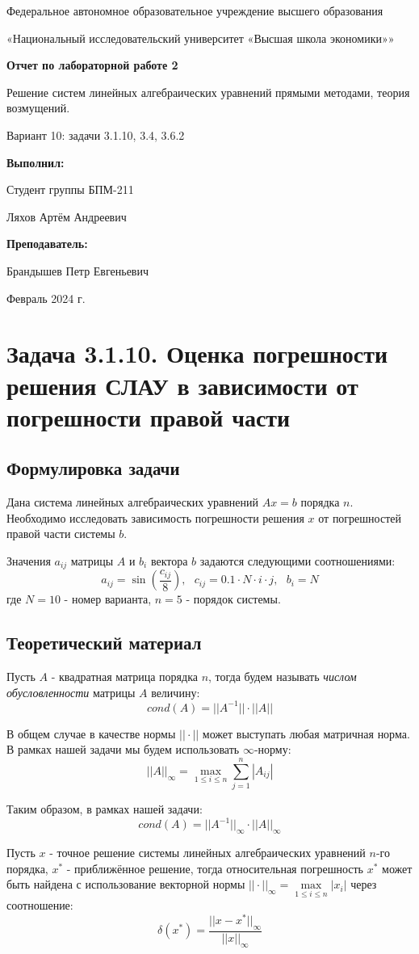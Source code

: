\documentclass[12pt]{article}%
\date{}{Февраль 2024 г.}
\newcommand*{\Title}{\begingroup
\centering 

\large {Федеральное автономное образовательное учреждение высшего образования}
\vspace*{\baselineskip}

\large {«Национальный исследовательский университет «Высшая школа экономики»»}
\vspace*{\baselineskip}

\vspace*{\baselineskip}
\large{\textbf{Отчет по лабораторной работе 2}}

\vspace{0.1cm}
\large{Решение систем линейных алгебраических уравнений прямыми методами, теория возмущений.}

\vspace{0.2cm}
\large{Вариант 10: задачи 3.1.10, 3.4, 3.6.2}

\vspace{1.5cm} 

\begin{flushright}
  \textbf{\normalsize Выполнил:}
  
  \vspace{0.3cm} 
  {\normalsize Студент группы БПМ-211}
  
  {\normalsize Ляхов Артём Андреевич}

\end{flushright}


\vspace{0.2cm}  
\begin{flushright}
  \textbf{\normalsize Преподаватель:} 

  \vspace{0.2cm}

 {\normalsize Брандышев Петр Евгеньевич}
 
\end{flushright}

\vfill
\date{}{Февраль 2024 г.}



\endgroup\clearpage}
\begin{document}
\Title
\tableofcontents
\newpage

\section{Задача 3.1.10. Оценка погрешности решения СЛАУ в зависимости от погрешности правой части}

\subsection{Формулировка задачи}
Дана система линейных алгебраических уравнений $Ax = b$ порядка $n$. Необходимо исследовать зависимость погрешности решения $x$ от погрешностей правой части системы $b$.

Значения $a_{ij}$ матрицы $A$ и $b_i$ вектора $b$ задаются следующими соотношениями:
\begin{equation*}
    a_{ij} = \sin\left(\frac{c_{ij}}{8}\right),\ \ \ 
    c_{ij} = 0.1\cdot N \cdot i \cdot j,\ \ \ 
    b_i = N
\end{equation*}
где $N = 10$ - номер варианта, $n=5$ - порядок системы.

\subsection{Теоретический материал}
Пусть $A$ - квадратная матрица порядка $n$, тогда будем называть \textit{числом обусловленности} матрицы $A$ величину:
\begin{equation*}
    cond(A) = ||A^{-1}||\cdot ||A||
\end{equation*}

В общем случае в качестве нормы $||\cdot||$ может выступать любая матричная норма. В рамках нашей задачи мы будем использовать $\infty$-норму:
\begin{equation}
    ||A||_{\infty} = 
    \max\limits_{1 \leqslant i \leqslant n}\sum\limits_{j=1}^{n}|A_{ij}|
\end{equation}

Таким образом, в рамках нашей задачи:
\begin{equation}
    cond(A) = ||A^{-1}||_{\infty} \cdot ||A||_{\infty} 
\end{equation}

Пусть $x$ - точное решение системы линейных алгебраических уравнений $n$-го порядка, $x^{*}$ - приближённое решение, тогда относительная погрешность $x^{*}$ может быть найдена с использование векторной нормы $||\cdot||_{\infty} = \max\limits_{1 \leqslant i \leqslant n}|x_i|$ 
через соотношение:
\begin{equation}
    \delta(x^{*}) = \frac{||x - x^{*}||_{\infty}}{||x||_{\infty}}
\end{equation}
\end{document}
